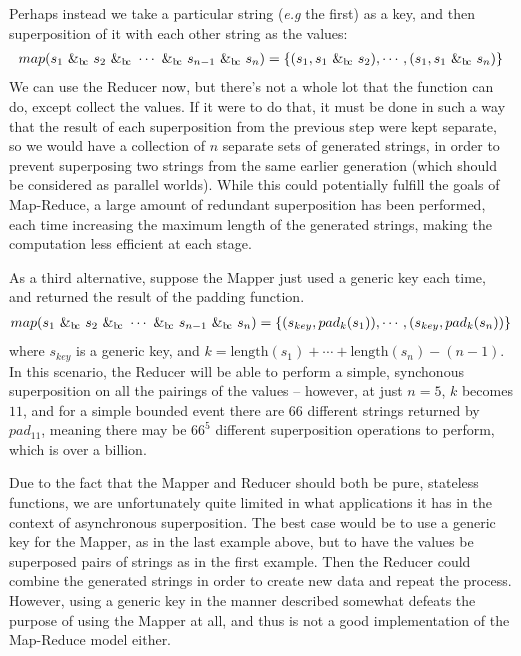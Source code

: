 \documentclass[a4paper,11pt]{article}
\newcommand{\bc}{{\rm b\!c}}
\newcommand{\vph}[1]{\vphantom{#1}}
\begin{document}
Perhaps instead we take a particular string (\textit{e.g} the first) as a key, 
and then superposition of it with each other string as the values:
\begin{align*}
map(s_1 ~\&_{\bc}~ s_2 ~\&_{\bc}~ \cdots ~\&_{\bc}~ s_{n-1} ~\&_{\bc}~ s_n) = 
\{(s_1, s_1 ~\&_{\bc}~ s_2), \cdots, (s_1, s_1 ~\&_{\bc}~ s_n)\}
\end{align*}
We can use the Reducer now, but there's not a whole lot that the function can 
do, except collect the values. If it were to do that, it must be done in such a 
way that the result of each superposition from the previous step were kept 
separate, so we would have a collection of $n$ separate sets of generated 
strings, in order to prevent superposing two strings from the same earlier 
generation (which should be considered as parallel worlds). While this could 
potentially fulfill the goals of Map-Reduce, a large amount of redundant 
superposition has been performed, each time increasing the maximum length of 
the generated strings, making the computation less efficient at each 
stage.

As a third alternative, suppose the Mapper just used a generic key each time, 
and returned the result of the padding function.
\begin{align*}
map(s_1 ~\&_{\bc}~ s_2 ~\&_{\bc}~ \cdots ~\&_{\bc}~ s_{n-1} ~\&_{\bc}~ s_n) = 
\{(s_{key}, pad_k(s_1)), \cdots, (s_{key}, pad_k(s_n))\}
\end{align*}
where $s_{key}$ is a generic key, and $k = \mbox{length}(s_1) + \cdots + 
\mbox{length}(s_n) - (n - 1)$. In this scenario, the Reducer will be able to 
perform a simple, synchonous superposition on all the pairings of the values -- 
however, at just $n=5$, $k$ becomes $11$, and for a simple 
bounded event \fbox{\vph{$e'$}}\fbox{$e\vph{e'}$}\fbox{\vph{$e'$}} there are 
$66$ different strings returned by $pad_{11}$, meaning there may be $66^5$ 
different superposition operations to perform, which is over a billion.

Due to the fact that the Mapper and Reducer should both be pure, stateless 
functions, we are unfortunately quite limited in what applications it has in 
the context of asynchronous superposition. The best case would be to use a 
generic key for the Mapper, as in the last example above, but to have the 
values be superposed pairs of strings as in the first example. Then the Reducer 
could combine the generated strings in order to create new data and repeat the 
process. However, using a generic key in the manner described somewhat defeats 
the purpose of using the Mapper at all, and thus is not a good implementation 
of the Map-Reduce model either.
\end{document}

